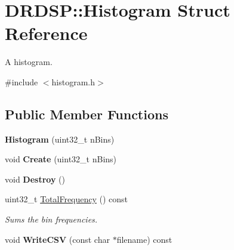 \hypertarget{struct_d_r_d_s_p_1_1_histogram}{\section{D\-R\-D\-S\-P\-:\-:Histogram Struct Reference}
\label{struct_d_r_d_s_p_1_1_histogram}
}


A histogram.  




{\ttfamily \#include $<$histogram.\-h$>$}

\subsection*{Public Member Functions}
\begin{DoxyCompactItemize}
\item 
\hypertarget{struct_d_r_d_s_p_1_1_histogram_a5555b96af544fc87151196d59d83c20a}{{\bfseries Histogram} (uint32\-\_\-t n\-Bins)}\label{struct_d_r_d_s_p_1_1_histogram_a5555b96af544fc87151196d59d83c20a}

\item 
\hypertarget{struct_d_r_d_s_p_1_1_histogram_a11252e6e91d54a93766eab33756e46fd}{void {\bfseries Create} (uint32\-\_\-t n\-Bins)}\label{struct_d_r_d_s_p_1_1_histogram_a11252e6e91d54a93766eab33756e46fd}

\item 
\hypertarget{struct_d_r_d_s_p_1_1_histogram_a84577ee394d1017b16aa4229ff7f5904}{void {\bfseries Destroy} ()}\label{struct_d_r_d_s_p_1_1_histogram_a84577ee394d1017b16aa4229ff7f5904}

\item 
\hypertarget{struct_d_r_d_s_p_1_1_histogram_adeb7a588aa66fe2e6dd0d851ea92d625}{uint32\-\_\-t \hyperlink{struct_d_r_d_s_p_1_1_histogram_adeb7a588aa66fe2e6dd0d851ea92d625}{Total\-Frequency} () const }\label{struct_d_r_d_s_p_1_1_histogram_adeb7a588aa66fe2e6dd0d851ea92d625}

\begin{DoxyCompactList}\small\item\em Sums the bin frequencies. \end{DoxyCompactList}\item 
\hypertarget{struct_d_r_d_s_p_1_1_histogram_a849de9ad07ff6c468dad15a9951a3f81}{void {\bfseries Write\-C\-S\-V} (const char $\ast$filename) const }\label{struct_d_r_d_s_p_1_1_histogram_a849de9ad07ff6c468dad15a9951a3f81}

\end{DoxyCompactItemize}
